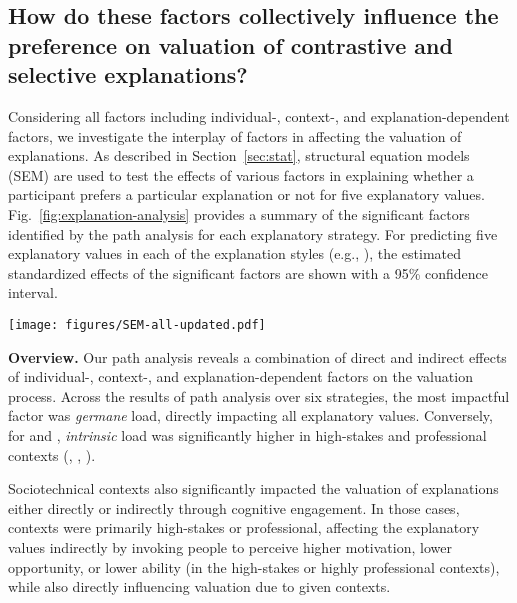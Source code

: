 \subsection{How do these factors collectively influence the preference on valuation of contrastive and selective explanations?}
Considering all factors including individual-, context-, and explanation-dependent factors, we investigate the interplay of factors in affecting the valuation of explanations.
As described in Section~\ref{sec:stat}, structural equation models (SEM) are used to test the effects of various factors in explaining whether a participant prefers a particular explanation or not for five explanatory values. Fig.~\ref{fig:explanation-analysis} provides a summary of the significant factors identified by the path analysis for each explanatory strategy. For predicting five explanatory values in each of the explanation styles (e.g., \cbhe), the estimated standardized effects of the significant factors are shown with a 95\% confidence interval.

\begin{figure*}[t]%
\centering
\texttt{[image: figures/SEM-all-updated.pdf]}
\caption{Path analysis results for each explanation strategy. Factors significantly influencing the valuation process of each explanation strategy identified in per-strategy path analysis are highlighted.}\label{fig:explanation-analysis}
\end{figure*}

\textbf{Overview.} Our path analysis reveals a combination of direct and indirect effects of individual-, context-, and explanation-dependent factors on the valuation process. Across the results of path analysis over six strategies, the most impactful factor was \textit{germane} load, directly impacting all explanatory values. Conversely, for \cf and \cbho, \textit{intrinsic} load was significantly higher in high-stakes and professional contexts (\loanN, \mediN, \mediP). 

Sociotechnical contexts also significantly impacted the valuation of explanations either directly or indirectly through cognitive engagement. In those cases, contexts were primarily high-stakes or professional, affecting the explanatory values indirectly by invoking people to perceive higher motivation, lower opportunity, or lower ability (in the high-stakes or highly professional contexts), while also directly influencing valuation due to given contexts. 

